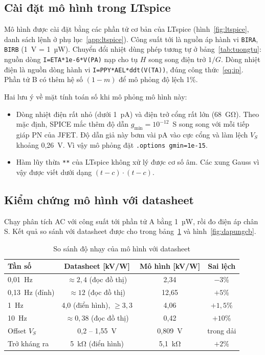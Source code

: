 \subsection{Cài đặt mô hình trong LTspice}

Mô hình được cài đặt bằng các phần tử cơ bản của LTspice (hình~\ref{fig:ltspice}, danh sách lệnh ở phụ lục~\ref{app:ltspice}). Công suất tới là nguồn áp hành vi \texttt{BIRA}, \texttt{BIRB} (1~V = 1~µW). Chuyển đổi nhiệt dùng phép tương tự ở bảng~\ref{tab:tuongtu}: nguồn dòng \texttt{I=ETA*1e-6*V(PA)} nạp cho tụ $H$ song song điện trở $1/G$. Dòng nhiệt điện là nguồn dòng hành vi \texttt{I=PPY*AEL*ddt(V(TA))}, đúng công thức~\eqref{eq:ip}. Phần tử B có thêm hệ số $(1-m)$ để mô phỏng độ lệch 1\%.


Hai lưu ý về mặt tính toán số khi mô phỏng mô hình này:
\begin{itemize}
  \item Dòng nhiệt điện rất nhỏ (dưới 1~pA) và điện trở cổng rất lớn (68~GΩ). Theo mặc định, SPICE mắc thêm độ dẫn $g_\text{min} = 10^{-12}$~S song song với mỗi tiếp giáp PN của JFET. Độ dẫn giả này bơm vài pA vào cực cổng và làm lệch $V_S$ khoảng 0,26~V. Vì vậy mô phỏng đặt \texttt{.options gmin=1e-15}.
  \item Hàm lũy thừa \texttt{**} của LTspice không xử lý được cơ số âm. Các xung Gauss vì vậy được viết dưới dạng $(t-c)\cdot(t-c)$.
\end{itemize}

\subsection{Kiểm chứng mô hình với datasheet}

Chạy phân tích AC với công suất tới phần tử A bằng 1~µW, rồi đo điện áp chân S. Kết quả so sánh với datasheet được cho trong bảng~\ref{tab:kiemchung} và hình~\ref{fig:dapungcb}.

\begin{table}[!htb]
\centering
\caption{So sánh độ nhạy của mô hình với datasheet \PYD{}}
\label{tab:kiemchung}
\small
\begin{tabular}{@{}lccc@{}}
\toprule
\textbf{Tần số} & \textbf{Datasheet [kV/W]} & \textbf{Mô hình [kV/W]} & \textbf{Sai lệch} \\ \midrule
0,01~Hz & $\approx 2{,}4$ (đọc đồ thị) & 2,34 & $-3$\% \\
0,13~Hz (đỉnh) & $\approx 12$ (đọc đồ thị) & 12,65 & $+5$\% \\
1~Hz & 4,0 (điển hình), $\ge 3{,}3$ & 4,06 & $+1{,}5$\% \\
10~Hz & $\approx 0{,}38$ (đọc đồ thị) & 0,42 & $+10$\% \\
\midrule
Offset $V_S$ & 0,2 -- 1,55~V & 0,809~V & trong dải \\
Trở kháng ra & 5~kΩ (điển hình) & 5,1~kΩ & $+2$\% \\
\bottomrule
\end{tabular}
\end{table}

